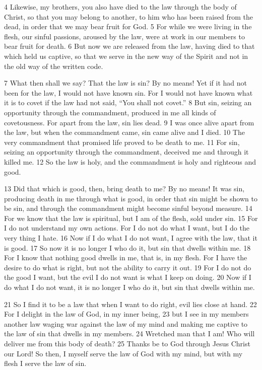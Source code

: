 \begin{bible}
4 Likewise, my brothers, you also have died to the law through the body of Christ, so that you may belong to another, to him who has been raised from the dead, in order that we may bear fruit for God. 5 For while we were living in the flesh, our sinful passions, aroused by the law, were at work in our members to bear fruit for death. 6 But now we are released from the law, having died to that which held us captive, so that we serve in the new way of the Spirit and not in the old way of the written code.

7 What then shall we say? That the law is sin? By no means! Yet if it had not been for the law, I would not have known sin. For I would not have known what it is to covet if the law had not said, ``You shall not covet.'' 8 But sin, seizing an opportunity through the commandment, produced in me all kinds of covetousness. For apart from the law, sin lies dead. 9 I was once alive apart from the law, but when the commandment came, sin came alive and I died. 10 The very commandment that promised life proved to be death to me. 11 For sin, seizing an opportunity through the commandment, deceived me and through it killed me. 12 So the law is holy, and the commandment is holy and righteous and good.

13 Did that which is good, then, bring death to me? By no means! It was sin, producing death in me through what is good, in order that sin might be shown to be sin, and through the commandment might become sinful beyond measure. 14 For we know that the law is spiritual, but I am of the flesh, sold under sin. 15 For I do not understand my own actions. For I do not do what I want, but I do the very thing I hate. 16 Now if I do what I do not want, I agree with the law, that it is good. 17 So now it is no longer I who do it, but sin that dwells within me. 18 For I know that nothing good dwells in me, that is, in my flesh. For I have the desire to do what is right, but not the ability to carry it out. 19 For I do not do the good I want, but the evil I do not want is what I keep on doing. 20 Now if I do what I do not want, it is no longer I who do it, but sin that dwells within me.

21 So I find it to be a law that when I want to do right, evil lies close at hand. 22 For I delight in the law of God, in my inner being, 23 but I see in my members another law waging war against the law of my mind and making me captive to the law of sin that dwells in my members. 24 Wretched man that I am! Who will deliver me from this body of death? 25 Thanks be to God through Jesus Christ our Lord! So then, I myself serve the law of God with my mind, but with my flesh I serve the law of sin.


\end{bible}
